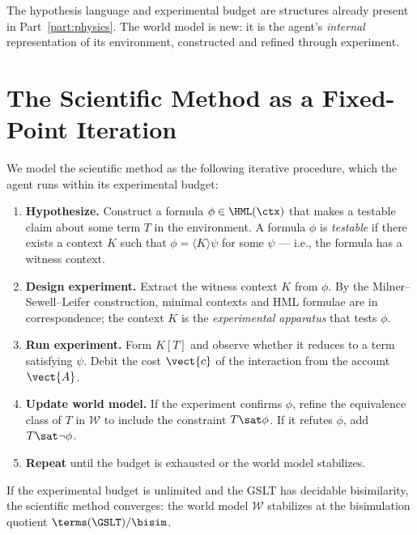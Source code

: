 \begin{remark}
The hypothesis language and experimental budget are structures
already present in Part~\ref{part:physics}.
The world model is new: it is the agent's \emph{internal} representation
of its environment, constructed and refined through experiment.
\end{remark}

\section{The Scientific Method as a Fixed-Point Iteration}

We model the scientific method as the following iterative procedure,
which the agent runs within its experimental budget:

\begin{enumerate}[label=\textbf{Step \arabic*.}, leftmargin=*, itemsep=4pt]
  \item \textbf{Hypothesize.} Construct a formula
        $\phi \in \HML(\ctx)$ that makes a testable claim about
        some term $T$ in the environment.
        A formula $\phi$ is \emph{testable} if there exists a
        context $K$ such that $\phi = \langle K \rangle \psi$
        for some $\psi$ --- i.e., the formula has a witness context.

  \item \textbf{Design experiment.} Extract the witness context $K$
        from $\phi$.
        By the Milner--Sewell--Leifer construction, minimal contexts
        and HML formulae are in correspondence; the context $K$ is
        the \emph{experimental apparatus} that tests $\phi$.

  \item \textbf{Run experiment.} Form $K[T]$ and observe whether it
        reduces to a term satisfying $\psi$.
        Debit the cost $\vect{c}$ of the interaction from the account
        $\vect{A}$.

  \item \textbf{Update world model.} If the experiment confirms $\phi$,
        refine the equivalence class of $T$ in $\mathcal{W}$ to include
        the constraint $T \sat \phi$.
        If it refutes $\phi$, add $T \sat \neg\phi$.

  \item \textbf{Repeat} until the budget is exhausted or the world
        model stabilizes.
\end{enumerate}

\begin{proposition}
If the experimental budget is unlimited and the GSLT has decidable
bisimilarity, the scientific method converges: the world model
$\mathcal{W}$ stabilizes at the bisimulation quotient
$\terms(\GSLT)/{\bisim}$.
\end{proposition}

